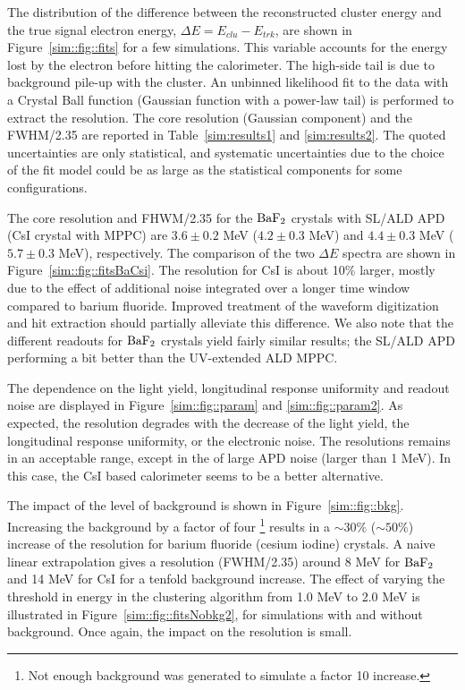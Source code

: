 The distribution of the difference between the reconstructed cluster energy and the true signal electron energy, $\Delta E = E_{clu}-E_{trk}$, 
are shown in Figure~\ref{sim::fig::fits} for a few simulations. This variable accounts for the energy lost by the electron before hitting 
the calorimeter. The high-side tail is due to background pile-up with the cluster. An unbinned likelihood fit to the data with a Crystal 
Ball function (Gaussian function with a power-law tail) is performed to extract the resolution. The core resolution (Gaussian component) 
and the FWHM/2.35 are reported in Table~\ref{sim:results1} and \ref{sim:results2}. The quoted uncertainties are only statistical, and 
systematic uncertainties due to the choice of the fit model could be as large as the statistical components for some configurations. 

The core resolution and FHWM/2.35 for the $\rm BaF_2$ crystals with SL/ALD APD (CsI crystal with MPPC) are $3.6 \pm 0.2$ MeV ($ 4.2 \pm 0.3$ MeV) 
and $4.4\pm 0.3$ MeV ($5.7 \pm 0.3$ MeV), respectively. The comparison of the two $\Delta E$ spectra are shown in Figure~\ref{sim::fig::fitsBaCsi}. 
The resolution for CsI is about 10\% larger, mostly due to the effect of additional noise integrated over a longer time window compared to 
barium fluoride. Improved treatment of the waveform digitization and hit extraction should partially alleviate this difference. We also note 
that the different readouts for $\rm BaF_2$ crystals yield fairly similar results; the SL/ALD APD performing a bit better than the 
UV-extended ALD MPPC.

The dependence on the light yield, longitudinal response uniformity and readout noise are displayed in Figure~\ref{sim::fig::param} and \ref{sim::fig::param2}. 
As expected, the resolution degrades with the decrease of the light yield, the longitudinal response uniformity, or the electronic noise. The resolutions 
remains in an acceptable range, except in the of large APD noise (larger than 1 MeV). In this case, the CsI based calorimeter seems to be a better alternative. 

The impact of the level of background is shown in Figure~\ref{sim::fig::bkg}. Increasing the background by a factor of four \footnote{Not enough background 
was generated to simulate a factor 10 increase.} results in a $\sim30\%$ ($\sim 50\%$) increase of the resolution for barium fluoride (cesium iodine) crystals. 
A naive linear extrapolation gives a resolution (FWHM/2.35) around 8 MeV for $\rm BaF_2$ and 14 MeV for CsI for a tenfold background increase. The effect of 
varying the threshold in energy in the clustering algorithm from 1.0 MeV to 2.0 MeV is illustrated in Figure~\ref{sim::fig::fitsNobkg2}, for simulations 
with and without background. Once again, the impact on the resolution is small.

